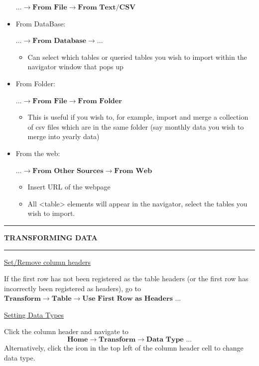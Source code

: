 \documentclass[8pt]{extarticle}
\newcommand{\heading}[1]{%
    \noindent
    \rule{\linewidth}{0.4pt}
    \begin{center}
        \vspace{-1ex}
        \textbf{#1}        
        \vspace{-2.5ex}
    \end{center}
    \rule{\linewidth}{0.4pt}
}
\begin{document}
\begin{multicols}{3}
\begin{itemize}
    $\dots \rightarrow \textbf{From File} \rightarrow \textbf{From Text/CSV}$
    \columnbreak
    \item From DataBase:

    $\dots \rightarrow \textbf{From Database} \rightarrow \dots$
    \begin{itemize}
        \item Can select which tables or queried tables you wish to import within the navigator window that pops up
    \end{itemize}
    \item From Folder:

    $\dots \rightarrow \textbf{From File} \rightarrow \textbf{From Folder}$
    \begin{itemize}
        \item This is useful if you wish to, for example, import and merge a collection of csv files which are in the same folder (say monthly data you wish to merge into yearly data)
    \end{itemize}
    \item From the web:

    $\dots \rightarrow \textbf{From Other Sources} \rightarrow \textbf{From Web}$
    \begin{itemize}
        \item Insert URL of the webpage
        \item All <table> elements will appear in the navigator, select the tables you wish to import.
    \end{itemize}
\end{itemize}

\heading{TRANSFORMING DATA}

\begin{center}
    \underline{Set/Remove column headers}
\end{center}

If the first row has not been registered as the table headers (or the first row has incorrectly been registered as headers), go to $\textbf{Transform} \rightarrow \textbf{Table} \rightarrow \textbf{Use First Row as Headers ...}$

\begin{center}
    \underline{Setting Data Types}
\end{center}

Click the column header and navigate to 
\[\textbf{Home} \rightarrow \textbf{Transform} \rightarrow \textbf{Data Type ...}\]
Alternatively, click the icon in the top left of the column header cell to change data type. 


\end{multicols}
\end{document}
